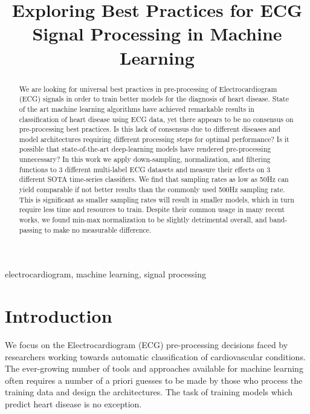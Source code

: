 \documentclass[pmlr,twocolumn]{jmlr}%
\title[ECG Scaling]{Exploring Best Practices for ECG Signal Processing in Machine Learning}
\author{\Name{Amir Salimi} \Email{{asalimi@ualberta.ca}\\
\Name{Abram Hindle} \Email{abram.hindle@ualberta.ca}\\
\Name{Osmar Zaiane} \Email{zaiane@ualberta.ca}\\
\Name{others} \Email{CVC@ualberta.ca}\\
\addr University of Alberta}}
\begin{document}
\maketitle

\begin{abstract}
We are looking for universal best practices in pre-processing of Electrocardiogram (ECG) signals in order to train better models for the diagnosis of heart disease.
State of the art machine learning algorithms have achieved remarkable results in classification of heart disease using ECG data, yet there appears to be no consensus on pre-processing best practices.  Is this lack of consensus due to different diseases and model architectures requiring different processing steps for optimal performance? Is it possible that state-of-the-art deep-learning models have rendered pre-processing unnecessary? In this work we apply down-sampling, normalization, and filtering functions to 3 different multi-label ECG datasets and measure their effects on 3 different SOTA time-series classifiers. We find that sampling rates as low as 50Hz can yield comparable if not better results than the commonly used 500Hz sampling rate. This is significant as smaller sampling rates will result in smaller models, which in turn require less time and resources to train. Despite their common usage in many recent works, we found min-max normalization to be slightly detrimental overall, and band-passing to make no measurable difference. 

\end{abstract}
\begin{keywords}
electrocardiogram, machine learning, signal processing
\end{keywords}


\section{Introduction}
\label{sec:intro}
We focus on the Electrocardiogram (ECG) pre-processing decisions faced by researchers working towards automatic classification of cardiovascular conditions. The ever-growing number of tools and approaches available for machine learning often requires a number of a priori guesses to be made by those who process the training data and design the architectures. The task of training models which predict heart disease is no exception.
\end{document}
